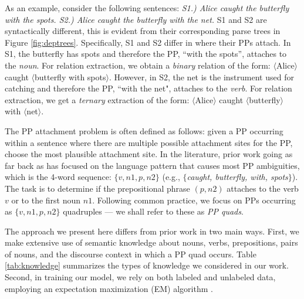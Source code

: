  
 As an example, consider the following sentences: \textit{ S1.) Alice caught the butterfly with the spots. S2.) Alice caught the butterfly with the net. }  S1 and S2 are syntactically different, this is evident from their corresponding parse trees in Figure \ref{fig:deptrees}. Specifically,  S1 and S2  differ in where their PPs attach. In  S1,  the butterfly has spots and therefore  the PP, ``with the spots'', attaches to the \textit{noun}. For relation extraction, we  obtain a \textit{binary} relation of the form:  
 $\langle$Alice$\rangle$  caught $\langle$butterfly with  spots$\rangle$.
However, in S2, the net is the instrument used for catching and therefore  the PP,  ``with the net", attaches to the \textit{verb}.  For relation extraction, we get a \textit{ternary} extraction of the form:
 $\langle$Alice$\rangle$  caught $\langle$butterfly$\rangle$ with $\langle$net$\rangle$.
 
The PP attachment problem is often defined as follows: given a PP occurring within a  sentence where there are multiple possible attachment sites for the PP, choose the most plausible attachment site. 
 In the literature,  prior work going as far back as \cite{BrillR94,Ratnaparkhi1994,Collins95} has  focused on the  language pattern that causes most PP ambiguities, which is the  4-word sequence: $\{v, n1, p, n2\}$ (e.g., $\{${\em caught, butterfly, with, spots}$\}$). The task is  to   determine if  the prepositional phrase $(p,n2)$  attaches to  the verb $v$ or to the first noun $n1$.
Following common practice,  we focus on  PPs occurring as $\{v,n1,p,n2\}$ quadruples ---  we shall refer to these as  \textit{PP quads}. 

The approach we present here differs from prior work in two main ways. First, we make extensive use of semantic knowledge about nouns, verbs, prepositions, pairs of nouns, and  the discourse context in which a PP quad occurs. Table \ref{tab:knowledge}  summarizes the types of  knowledge we considered in our work. Second, in training our model, we rely on both labeled and unlabeled data, employing an expectation maximization (EM) algorithm \cite{Dempster77maximumlikelihood}. 


